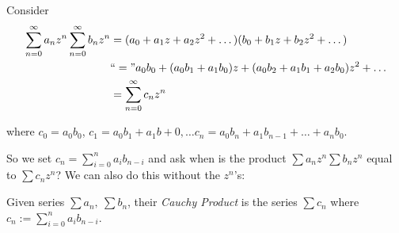 \documentclass[10pt,twoside]{scrartcl}
\begin{document}
Consider 
\begin{align*}
\sum_{n=0}^{\infty} a_nz^n \sum_{n=0}^{\infty}b_nz^n &= (a_0 + a_1z + a_2z^2 + \dots) (b_0 + b_1z + b_2z^2 + \dots)\\
&``=" a_0b_0 + (a_0b_1 + a_1b_0)z + (a_0b_2 + a_1b_1 + a_2b_0)z^2 + \dots \\
&= \sum_{n=0}^{\infty} c_nz^n 	
\end{align*}

where $c_0 = a_0b_0$, $c_1 = a_0b_1 + a_1b+0, \dots c_n = a_0b_n + a_1b_{n-1} + \dots + a_nb_0$. 

So we set $c_n = \sum_{i=0}^{n} a_i b_{n-i}$ and ask when is the product $\sum a_nz^n \sum b_nz^n$ equal to $\sum c_nz^n$? We can also do this without the $z^n$'s:\\

\begin{definition}
Given series $\sum a_n,~\sum b_n$, their \emph{Cauchy Product} is the series $\sum c_n$ where $c_n := \sum_{i=0}^n a_ib_{n-i}$.	
\end{definition}\vspace*{5pt}
\end{document}
